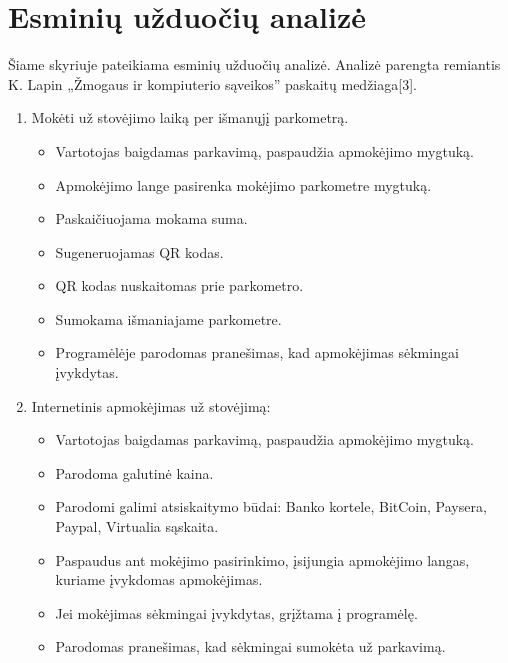 \documentclass{VUMIFPSkursinis}
\begin{document}
\section{Esminių užduočių analizė}
Šiame skyriuje pateikiama esminių užduočių analizė. Analizė parengta remiantis K. Lapin „Žmogaus ir kompiuterio sąveikos” paskaitų medžiaga[3]. 
\begin{enumerate}
	\item Mokėti už stovėjimo laiką per išmanųjį parkometrą.
		\begin{itemize}
			\item Vartotojas baigdamas parkavimą, paspaudžia apmokėjimo mygtuką.
			\item Apmokėjimo lange pasirenka mokėjimo parkometre mygtuką.
			\item Paskaičiuojama mokama suma.
			\item Sugeneruojamas QR kodas.
			\item QR kodas nuskaitomas prie parkometro.
			\item Sumokama išmaniajame parkometre.
			\item Programėlėje parodomas pranešimas, kad apmokėjimas sėkmingai įvykdytas.
		\end{itemize}
	\item Internetinis apmokėjimas už stovėjimą:
		\begin{itemize}
			\item Vartotojas baigdamas parkavimą, paspaudžia apmokėjimo mygtuką.
			\item Parodoma galutinė kaina.
			\item Parodomi galimi atsiskaitymo būdai: Banko kortele, BitCoin, Paysera, Paypal, Virtualia sąskaita.
			\item Paspaudus ant mokėjimo pasirinkimo, įsijungia apmokėjimo langas, kuriame įvykdomas apmokėjimas.
			\item Jei mokėjimas sėkmingai įvykdytas, grįžtama į programėlę.
			\item Parodomas pranešimas, kad sėkmingai sumokėta už parkavimą.


\end{itemize}
\end{enumerate}
\end{document}
